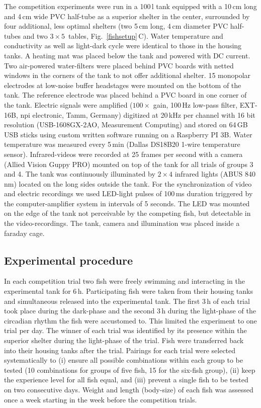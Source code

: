 \documentclass[vruler,JEB]{COB}%
\newcommand{\panel}[1]{\textsf{#1}}
\newcommand{\subfref}[2]{\textup{\ref{#1}}\,\panel{#2}}
\newcommand{\Figb}{Fig.}
\newcommand{\Subfigrefb}[2]{\Figb~\subfref{#1}{#2}}
\begin{document}
The competition experiments were run in a 100\,l tank equipped with a 10\,cm long and 4\,cm wide PVC half-tube as a superior shelter in the center, surrounded by four additional, less optimal shelters (two 5\,cm long, 4\,cm diameter PVC half-tubes and two $3\times 5$\,\centi\meter\squared{} tables, \Subfigrefb{fishsetup}{C}). Water temperature and conductivity as well as light-dark cycle were identical to those in the housing tanks. A heating mat was placed below the tank and powered with DC current. Two air-powered water-filters were placed behind PVC boards with netted windows in the corners of the tank to not offer additional shelter. 15 monopolar electrodes at low-noise buffer headstages were mounted on the bottom of the tank. The reference electrode was placed behind a PVC board in one corner of the tank. Electric signals were amplified ($100\times$ gain, 100\,Hz low-pass filter, EXT-16B, npi electronic, Tamm, Germany) digitized at 20\,kHz per channel with 16 bit resolution (USB-1608GX-2AO, Measurement Computing) and stored on 64\,GB USB sticks using custom written software running on a Raspberry PI 3B.  Water temperature was measured every 5\,min (Dallas DS18B20 1-wire temperature sensor). Infrared-videos were recorded at 25 frames per second with a camera (Allied Vision Guppy PRO) mounted on top of the tank for all trials of groups 3 and 4. The tank was continuously illuminated by $2\times 4$ infrared lights (ABUS 840\,nm) located on the long sides outside the tank.  For the synchronization of video and electric recordings we used LED-light pulses of 100\,ms duration triggered by the computer-amplifier system in intervals of 5 seconds. The LED was mounted on the edge of the tank not perceivable by the competing fish, but detectable in the video-recordings. The tank, camera and illumination was placed inside a faraday cage.

\subsection{Experimental procedure}

In each competition trial two fish were freely swimming and interacting in the experimental tank for 6\,h. Participating fish were taken from their housing tanks and simultaneous released into the experimental tank. The first 3\,h of each trial took place during the dark-phase and the second 3\,h during the light-phase of the circadian rhythm the fish were accustomed to. This limited the experiment to one trial per day. The winner of each trial was identified by its presence within the superior shelter during the light-phase of the trial. Fish were transferred back into their housing tanks after the trial. Pairings for each trial were selected systematically to (i) ensure all possible combinations within each group to be tested (10 combinations for groups of five fish, 15 for the six-fish group), (ii) keep the experience level for all fish equal, and (iii) prevent a single fish to be tested on two consecutive days. Weight and length (body-size) of each fish was assessed once a week starting in the week before the competition trials. 
\end{document}
